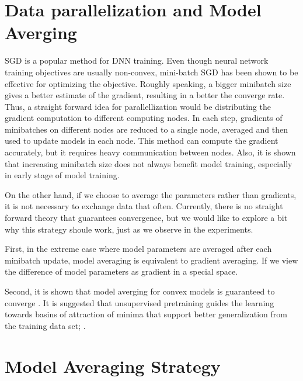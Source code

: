 \documentclass{article}
\begin{document}
\section{Data parallelization and Model Averging}
SGD is a popular method for DNN training. Even though neural network training objectives are usually non-convex, 
mini-batch SGD has been shown to be effective for optimizing the objective\cite{seide2011conversational}. 
Roughly speaking, a bigger minibatch size gives a better estimate of the gradient, resulting in a better the converge rate. 
Thus, a straight forward idea for parallellization would be distributing the gradient computation to different computing
nodes. In each step, gradients of minibatches on different nodes are reduced to a single node, averaged and then used to 
update models in each node. This method can compute the gradient accurately, but it requires heavy communication between nodes.
Also, it is shown that increasing minibatch size does not always benefit model training\cite{seide2011conversational}, 
especially in early stage of model training.

On the other hand, if we choose to average the parameters rather than gradients, it is not necessary to exchange data that often. 
Currently, there is no straight forward theory that guarantees convergence, but we would like to explore a bit why this strategy 
shoule work, just as we observe in the experiments.

First, in the extreme case where model parameters are averaged after each minibatch update, model averaging is equivalent to 
gradient averaging. If we view the difference of model parameters as gradient in a special space.

Second, it is shown that model averging for convex models is guaranteed to converge \cite{mcdonald2010distributed,mcdonald2009efficient}.
It is suggested that unsupervised pretraining guides the learning towards basins of attraction of minima that support better generalization
from the training data set; \cite{erhan2010does}.

\section{Model Averaging Strategy}
\end{document}
